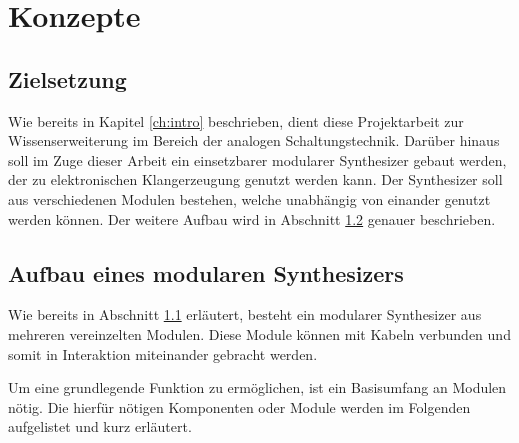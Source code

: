 \chapter{Konzepte}
\label{ch:concept}

\section{Zielsetzung}
\label{sec:zielsetzung}
Wie bereits in Kapitel \ref{ch:intro} beschrieben, dient diese Projektarbeit zur Wissenserweiterung im Bereich der analogen Schaltungstechnik.
Darüber hinaus soll im Zuge dieser Arbeit ein einsetzbarer modularer Synthesizer gebaut werden, der zu elektronischen Klangerzeugung genutzt werden kann. 
Der Synthesizer soll aus verschiedenen Modulen bestehen, welche unabhängig von einander genutzt werden können. 
Der weitere Aufbau wird in Abschnitt \ref{sec:AufbauSynth} genauer beschrieben. 


\section{Aufbau eines modularen Synthesizers}
\label{sec:AufbauSynth}
Wie bereits in Abschnitt \ref{sec:zielsetzung} erläutert, besteht ein modularer Synthesizer aus mehreren vereinzelten Modulen. 
Diese Module können mit Kabeln verbunden und somit in Interaktion miteinander gebracht werden. 

Um eine grundlegende Funktion zu ermöglichen, ist ein Basisumfang an Modulen nötig.
Die hierfür nötigen Komponenten oder Module werden im Folgenden aufgelistet und kurz erläutert.

